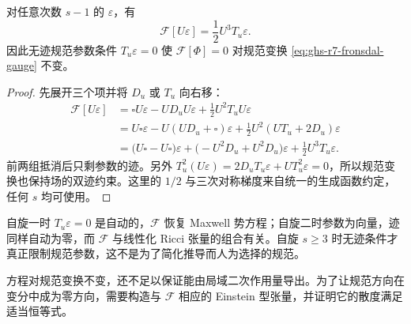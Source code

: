 \begin{theorem}[任意整数自旋的平直规范恒等式]\label{thm:ghs-r7-fronsdal-gauge}
对任意次数 $s-1$ 的 $\varepsilon$，有
\begin{equation}\label{eq:ghs-r7-fronsdal-gauge-variation}
 \mathcal F[U\varepsilon]=\frac12U^3T_u\varepsilon.
\end{equation}
因此无迹规范参数条件 $T_u\varepsilon=0$ 使 $\mathcal F[\Phi]=0$ 对规范变换 \cref{eq:ghs-r7-fronsdal-gauge} 不变。
\end{theorem}
\begin{proof}
先展开三个项并将 $D_u$ 或 $T_u$ 向右移：
\begin{align*}
 \mathcal F[U\varepsilon]
 &=\square U\varepsilon-U D_uU\varepsilon
   +\frac12U^2T_uU\varepsilon\\
 &=U\square\varepsilon
   -U(UD_u+\square)\varepsilon
   +\frac12U^2(UT_u+2D_u)\varepsilon\\
 &=\bigl(U\square-U\square\bigr)\varepsilon
   +\bigl(-U^2D_u+U^2D_u\bigr)\varepsilon
   +\frac12U^3T_u\varepsilon.
\end{align*}
前两组抵消后只剩参数的迹。另外 $T_u^2(U\varepsilon)=2D_uT_u\varepsilon+UT_u^2\varepsilon=0$，所以规范变换也保持场的双迹约束。这里的 $1/2$ 与三次对称梯度来自统一的生成函数约定，任何 $s$ 均可使用。
\end{proof}

自旋一时 $T_u\varepsilon=0$ 是自动的，$\mathcal F$ 恢复 Maxwell 势方程；自旋二时参数为向量，迹同样自动为零，而 $\mathcal F$ 与线性化 Ricci 张量的组合有关。自旋 $s\ge3$ 时无迹条件才真正限制规范参数，这不是为了简化推导而人为选择的规范。

方程对规范变换不变，还不足以保证能由局域二次作用量导出。为了让规范方向在变分中成为零方向，需要构造与 $\mathcal F$ 相应的 Einstein 型张量，并证明它的散度满足适当恒等式。


